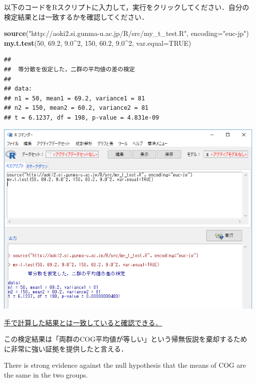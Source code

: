 \documentclass[11pt,]{problemset}
\newenvironment{Shaded}{\begin{snugshade}}{\end{snugshade}}
\newcommand{\DataTypeTok}[1]{\textcolor[rgb]{0.13,0.29,0.53}{#1}}
\newcommand{\DecValTok}[1]{\textcolor[rgb]{0.00,0.00,0.81}{#1}}
\newcommand{\FloatTok}[1]{\textcolor[rgb]{0.00,0.00,0.81}{#1}}
\newcommand{\KeywordTok}[1]{\textcolor[rgb]{0.13,0.29,0.53}{\textbf{#1}}}
\newcommand{\NormalTok}[1]{#1}
\newcommand{\OperatorTok}[1]{\textcolor[rgb]{0.81,0.36,0.00}{\textbf{#1}}}
\newcommand{\OtherTok}[1]{\textcolor[rgb]{0.56,0.35,0.01}{#1}}
\newcommand{\StringTok}[1]{\textcolor[rgb]{0.31,0.60,0.02}{#1}}
\begin{document}
以下のコードをRスクリプトに入力して，実行をクリックしてください．自分の検定結果とは一致するかを確認してください．

\begin{Shaded}
\begin{Highlighting}[]
\KeywordTok{source}\NormalTok{(}\StringTok{"http://aoki2.si.gunma-u.ac.jp/R/src/my_t_test.R"}\NormalTok{, }\DataTypeTok{encoding=}\StringTok{"euc-jp"}\NormalTok{)}
\KeywordTok{my.t.test}\NormalTok{(}\DecValTok{50}\NormalTok{, }\FloatTok{69.2}\NormalTok{, }\FloatTok{9.0}\OperatorTok{^}\DecValTok{2}\NormalTok{, }\DecValTok{150}\NormalTok{, }\FloatTok{60.2}\NormalTok{, }\FloatTok{9.0}\OperatorTok{^}\DecValTok{2}\NormalTok{, }\DataTypeTok{var.equal=}\OtherTok{TRUE}\NormalTok{)}
\end{Highlighting}
\end{Shaded}

\begin{verbatim}
## 
##  等分散を仮定した，二群の平均値の差の検定
## 
## data:  
## n1 = 50, mean1 = 69.2, variance1 = 81
## n2 = 150, mean2 = 60.2, variance2 = 81
## t = 6.1237, df = 198, p-value = 4.831e-09
\end{verbatim}

\begin{center}\includegraphics[width=0.9\linewidth]{pic/myttest01} \end{center}
\bigskip

\underline{手で計算した結果とは一致していると確認できる．}

この検定結果は「両群のCOG平均値が等しい」という帰無仮説を棄却するために非常に強い証拠を提供したと言える．

There is strong evidence against the null hypothesis that the means of
COG are the same in the two groups.
\end{document}

